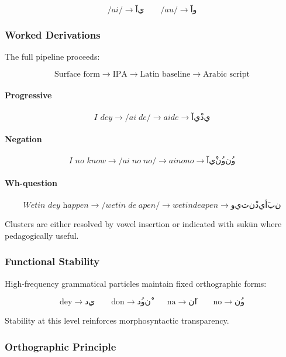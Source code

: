 \documentclass[12pt]{article}
\begin{document}
\[
/ai/ \rightarrow آي \qquad /au/ \rightarrow آو
\]

\subsubsection{Worked Derivations}

The full pipeline proceeds:

\[
\text{Surface form} \rightarrow \text{IPA} \rightarrow \text{Latin baseline} \rightarrow \text{Arabic script}
\]

\paragraph{Progressive}

\[
\textit{I dey} \rightarrow /ai\; de/ \rightarrow ai de \rightarrow آيْ دِي
\]

\paragraph{Negation}

\[
\textit{I no know} \rightarrow /ai\; no\; no/ \rightarrow ai no no \rightarrow آيْ نُو نُو
\]

\paragraph{Wh-question}

\[
\textit{Wetin dey happen} \rightarrow /wetin\; de\; apen/ \rightarrow wetin de apen
\rightarrow وِيتِنْ دِي أَبِن
\]

Clusters are either resolved by vowel insertion or indicated with sukūn where pedagogically useful.

\subsubsection{Functional Stability}

High-frequency grammatical particles maintain fixed orthographic forms:

\[
\text{dey} \rightarrow دِي \qquad
\text{don} \rightarrow دُونْ \qquad
\text{na} \rightarrow نَا \qquad
\text{no} \rightarrow نُو
\]

Stability at this level reinforces morphosyntactic transparency.

\subsubsection{Orthographic Principle}
\end{document}
